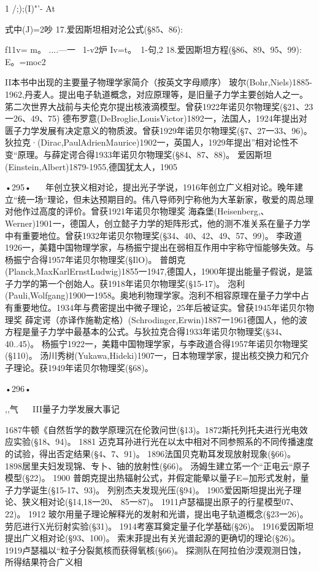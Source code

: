 1
/;);(I)"'-
At

式中(J)=2吵
17.爱因斯坦相对沦公式(§85、86):

f11v=
m。
....—一
~1-v2炉
Iv=t。~1-句,2
18.爱因斯坦方程(§86、89、95、99):
E。=moc2

II本书中出现的主要量子物理学家简介（按英文字母顺序）
玻尔(Bohr,Niels)1885-1962,丹麦人。提出电子轨道概念，对应原理等，是旧量子力学主要创始人之一。笫二次世界大战前与夫伦克尔提出核液滴模型。曾获1922年诺贝尔物理奖(§21、23一26、49、75)
德布罗意(DeBroglie,LouisVictor)1892一，法国人，1924年提出对匮子力学发展有决定意义的物质波。曾获1929年诺贝尔物理奖(§7、27一33、96)。
狄拉克·(Dirac,PaulAdrienMaurice)1902一，英国人，1929年提出”相对论性不变“原理。与薛定谔合得1933年诺贝尔物理奖(§84、87、88)。
爱因斯坦(Einstein,Albert)1879-1955,德国犹太人，1905

•295•
  
年创立狭义相对论，提出光子学说，1916年创立广义相对论。晚年建立“统一场“理论，但未达预期目的。伟八导师列宁称他为大革新家，敬爱的周总理对他作过高度的评价。曾获1921年诺贝尔物理奖
海森堡(Heisenberg,、Werner)1901一，德国人，创立懿子力学的矩阵形式，他的测不准关系在量子力学中有重要地位。曾获1932年诺贝尔物理奖(§34、40、42、49、57、99)。
李政道1926一，美籍中国物理学家，与杨振宁提出在弱相互作用中宇称守恒能够失效。与杨振宁合得1957年诺贝尔物理奖(§IlO)。
普朗克(Planck,MaxKarlErnstLudwig)1855一1947,德国人，1900年提出能量子假说，是篮子力学的第一个创始人。获1918年诺贝尔物理奖(§15-17)。
泡利(Pauli,Wolfgang)1900一1958。奥地利物理学家。泡利不相容原理在量子力学中占有重要地位。1934年与费密提出中微子理论，25年后被证实。曾获1945年诺贝尔物理奖
薛定谔（亦译作施勒定格）(Schrodinger,Erwin)1887一1961德国人，他的波方程是量子力学中最基本的公式。与狄拉克合得1933年诺贝尔物理奖(§34、40..45)。
杨振宁1922一，美籍中国物理学家，与李政道合得1957年诺贝尔物理奖(§110)。
汤川秀树(Yukawa,Hideki)1907一，日本物理学家，提出核交换力和冗介子理论。获1949年诺贝尔物理奖(§68)。

•296•
 

,,气
  
III量子力学发展大事记

1687牛顿《自然哲学的数学原理沉在伦敦问世(§13)。1872斯托列托夫进行光电效应实验(§18、94)。
	1881	迈克耳孙进行光在以太中相对不同参照系的不同传播速度的试验，得出否定结果(§4、7、91)。
1896法国贝克勒耳发现放射现象(§66)。
1898居里夫妇发现锦、专卜、铀的放射性(§66)。
汤姆生建立笫一个“正电云“原子模型(§22)。
	1900	普朗克提出热辐射公式，并假定能晕以量子E=加形式发射，量子力学诞生(§15-17、93)。
列别杰夫发现光压(§94)。
1905爱因斯坦提出光子理论、狭义相对论(§14,18一20、
85一87)。
1911卢瑟福提出原子的行星模型07、22)。
	1912	玻尔用量子理论解释光的发射和光谱，提出电子轨道概念(§23一26)。
劳厄进行X光衍射实验(§31)。
1914考塞耳奠定量子化学基础(§26)。
1916爱因斯坦提出广义相对论(§93、100)。
索末菲提出有关光谱起源的更确切的理论(§26)。
1919卢瑟福以“粒子分裂氮核而获得氧核(§66)。
探测队在阿拉伯沙漠观测日蚀，所得结果符合广义相

